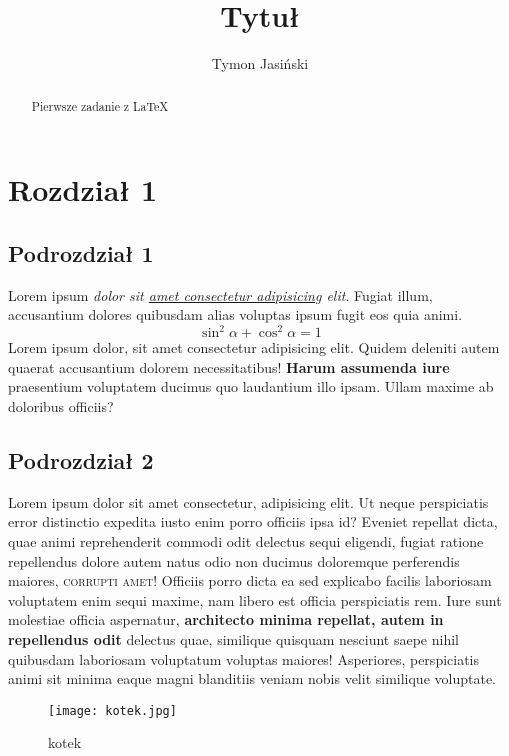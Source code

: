 \documentclass[12pt,a4paper]{article}
\title{Tytuł}
\author{Tymon Jasiński}
\begin{document}
	\maketitle
	
	\begin{abstract}
		Pierwsze zadanie z \LaTeX  
	\end{abstract}
	
	
	\tableofcontents
	\listoftables
	\listoffigures
	
	\newpage
	
	\section{Rozdział 1}
	\subsection{Podrozdział 1}
	 Lorem ipsum \textit{dolor sit \underline{amet consectetur adipisicing} elit}. Fugiat illum, accusantium dolores quibusdam alias voluptas ipsum fugit eos quia animi.
	\[
 \sin^2\alpha + \cos^2\alpha = 1
\]
\label{wzor 1}
Lorem ipsum dolor, sit amet consectetur adipisicing elit. Quidem deleniti autem quaerat accusantium dolorem necessitatibus! \textbf{Harum assumenda iure} praesentium voluptatem ducimus quo laudantium illo ipsam. Ullam maxime ab doloribus officiis?


	\subsection{Podrozdział 2}
	Lorem ipsum dolor sit amet consectetur, adipisicing elit. Ut neque perspiciatis error distinctio expedita iusto enim porro officiis ipsa id? Eveniet repellat dicta, quae animi reprehenderit commodi odit delectus sequi eligendi, fugiat ratione repellendus dolore autem natus odio non ducimus doloremque perferendis maiores, \textsc{corrupti amet!} Officiis porro dicta ea sed explicabo facilis laboriosam voluptatem enim sequi maxime, nam libero est officia perspiciatis rem. Iure sunt molestiae officia aspernatur, \textbf{architecto minima repellat, autem in repellendus odit} delectus quae, similique quisquam nesciunt saepe nihil quibusdam laboriosam voluptatum voluptas maiores! Asperiores, perspiciatis animi sit minima eaque magni blanditiis veniam nobis velit similique voluptate.
	\begin{figure}[H]
		\centering
		\texttt{[image: kotek.jpg]}
		\caption{kotek}
	\end{figure}
 \label{kotek}
	
\end{document}
